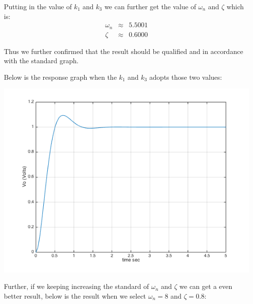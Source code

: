 \documentclass[11pt]{scrartcl}
\begin{document}
Putting in the value of $k_1$ and $k_3$ we can further get the value of $\omega_n$ and $\zeta$ which is:
\begin{eqnarray*}
\omega_n &\approx& 5.5001\\
\zeta &\approx& 0.6000
\end{eqnarray*}

Thus we further confirmed that the result should be qualified and in accordance with the standard graph.

Below is the response graph when the $k_1$ and $k_3$ adopts those two values:

\begin{minipage}[t]{\linewidth}

{
\includegraphics[scale = 0.7]{fig_4.png}
}
\end{minipage}
\medskip

Further, if we keeping increasing the standard of $\omega_n$ and $\zeta$ we can get a even better result, below is the result when we select $\omega_n=8$ and $\zeta=0.8$:\\
\end{document}
